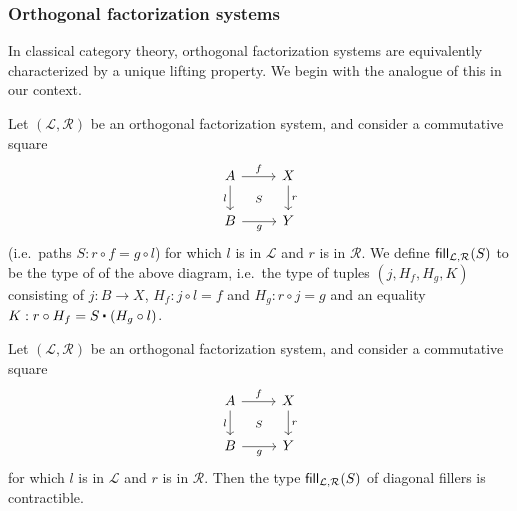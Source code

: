 \subsubsection{Orthogonal factorization systems}

In classical category theory, orthogonal factorization systems are equivalently characterized by a unique lifting property.
We begin with the analogue of this in our context.

\begin{defn}
Let $(\mathcal{L},\mathcal{R})$ be an orthogonal factorization system, and
consider a commutative square
\begin{equation*}
\begin{tikzcd}
A \arrow[r,"f"] \arrow[d,swap,"l"] \ar[dr,phantom,"\scriptstyle S"] & X \arrow[d,"r"] \\
B \arrow[r,swap,"g"] & Y
\end{tikzcd}
\end{equation*}
(i.e.\ paths $S : r\circ f = g\circ l$)
for which $l$ is in $\mathcal{L}$ and $r$ is in $\mathcal{R}$. We define
$\mathsf{fill}_{\mathcal{L},\mathcal{R}}(S)$ to be the type of 
of the above diagram, i.e.~the type of tuples $(j,H_f,H_g,K)$ consisting of
$j:B\to X$, $H_f:j\circ l=f$ and $H_g:r\circ j=g$ and an equality $K : r\circ H_f = \ct S{(H_g \circ l)}$.
\end{defn}

\begin{lem}\label{lem:diagonal_fillers}
Let $(\mathcal{L},\mathcal{R})$ be an orthogonal factorization system, and
consider a commutative square
\begin{equation*}
\begin{tikzcd}
A \arrow[r,"f"] \arrow[d,swap,"l"] \ar[dr,phantom,"\scriptstyle S"] & X \arrow[d,"r"] \\
B \arrow[r,swap,"g"] & Y
\end{tikzcd}
\end{equation*}
for which $l$ is in $\mathcal{L}$ and $r$ is in $\mathcal{R}$. Then the type
$\mathsf{fill}_{\mathcal{L},\mathcal{R}}(S)$ of diagonal fillers is contractible.
\end{lem}

